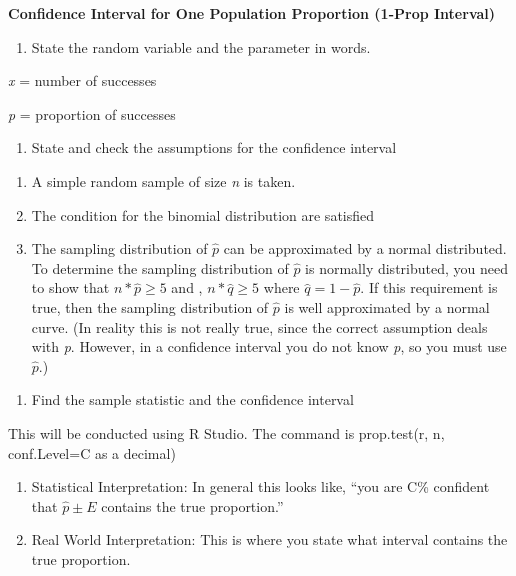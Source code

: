\documentclass[]{book}
\providecommand{\tightlist}{%
  \setlength{\itemsep}{0pt}\setlength{\parskip}{0pt}}
\begin{document}
\textbf{Confidence Interval for One Population Proportion (1-Prop Interval)}

\begin{enumerate}
\def\labelenumi{\arabic{enumi}.}
\tightlist
\item
  State the random variable and the parameter in words.
\end{enumerate}

\emph{x} = number of successes

\emph{p} = proportion of successes

\begin{enumerate}
\def\labelenumi{\arabic{enumi}.}
\setcounter{enumi}{1}
\tightlist
\item
  State and check the assumptions for the confidence interval
\end{enumerate}

\begin{enumerate}
\def\labelenumi{\alph{enumi}.}
\item
  A simple random sample of size \emph{n} is taken.
\item
  The condition for the binomial distribution are satisfied
\item
  The sampling distribution of \(\hat{p}\) can be approximated by a normal distributed. To determine the sampling distribution of \(\hat{p}\) is normally distributed, you need to show that \(n*\hat{p}\ge5\) and , \(n*\hat{q}\ge5\) where \(\hat{q}=1-\hat{p}\). If this requirement is true, then the sampling distribution of \(\hat{p}\) is well approximated by a normal curve. (In reality this is not really true, since the correct assumption deals with \emph{p}. However, in a confidence interval you do not know \emph{p}, so you must use \(\hat{p}\).)
\end{enumerate}

\begin{enumerate}
\def\labelenumi{\arabic{enumi}.}
\setcounter{enumi}{2}
\tightlist
\item
  Find the sample statistic and the confidence interval
\end{enumerate}

This will be conducted using R Studio. The command is prop.test(r, n, conf.Level=C as a decimal)

\begin{enumerate}
\def\labelenumi{\arabic{enumi}.}
\setcounter{enumi}{3}
\item
  Statistical Interpretation: In general this looks like, ``you are C\% confident that \(\hat{p}\pm E\) contains the true proportion.''
\item
  Real World Interpretation: This is where you state what interval contains the true proportion.
\end{enumerate}
\end{document}
